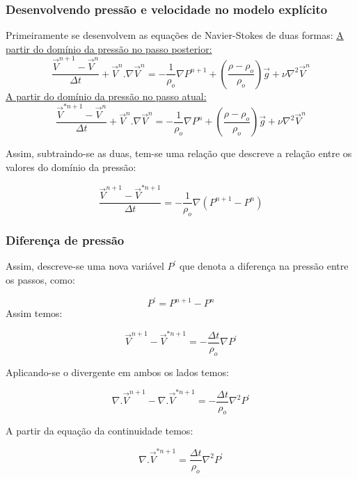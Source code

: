 \documentclass[xcolor=dvipsnames,10pt,aspectratio=169]{beamer}
\begin{document}
	
	\begin{frame}
		\frametitle{Desenvolvendo pressão e velocidade no modelo explícito}
		\flushleft
		Primeiramente se desenvolvem as equações de Navier-Stokes de duas formas:\vspace{0.5cm}
		\centering
		\underline{A partir do domínio da pressão no passo posterior:}
		\begin{equation}\label{equation1}
		\frac{\vec{V}^{n + 1} - \vec{V}^{n}}{\Delta t} + \vec{V}^{n} . {\nabla} \vec{V}^{n} = - \frac{1}{\rho_o}\nabla P^{n + 1} + \left( \frac{\rho - \rho_o}{\rho_o} \right) \vec{g} + \nu \nabla^2 \vec{V}^{n}
		\end{equation}
		\underline{A partir do domínio da pressão no passo atual:}
		\begin{equation}\label{eqlabel1}
		\frac{\vec{V}^{\ast{n + 1}} - \vec{V}^{n}}{\Delta t} + \vec{V}^{n} . {\nabla} \vec{V}^{n} = - \frac{1}{\rho_o}\nabla P^{n} + \left( \frac{\rho - \rho_o}{\rho_o} \right) \vec{g} + \nu \nabla^2 \vec{V}^{n}
		\end{equation}
		
		Assim, subtraindo-se as duas, tem-se uma relação que descreve a relação entre os valores do domínio da pressão:
		
		\begin{equation}
		\frac{\vec{V}^{{n + 1}} - \vec{V}^{{\ast n+1} }}{\Delta t} = - \frac{1}{\rho_o}\nabla \left( P^{n+1} - P ^n\right)
		\end{equation}
		
		
		
	\end{frame}




	\begin{frame}
		\frametitle{Diferença de pressão}
		\flushleft
		Assim, descreve-se uma nova variável $ P^\prime $ que denota a diferença na pressão entre os passos, como:
		
		\begin{equation}
		P^\prime = P^{n + 1} - P^n
		\end{equation}
		Assim temos:
		
		\begin{equation}\label{eqlabel3}
		\vec{V}^{n+1} - \vec{V}^{\ast{n + 1}} = - \frac{\Delta t}{\rho_o} \nabla P^\prime
		\end{equation}
		
		Aplicando-se o divergente em ambos os lados temos:
		
		\begin{equation}
		\nabla . \vec{V}^{n+1} - \nabla .\vec{V}^{\ast{n + 1}} = - \frac{\Delta t}{\rho_o} \nabla^2 P^\prime
		\end{equation}
		
		A partir da equação da continuidade temos:
		
		\begin{equation}\label{eqlabel2}
		\nabla .\vec{V}^{\ast{n + 1}} = \frac{\Delta t}{\rho_o} \nabla^2 P^\prime
		\end{equation}
		
	
	\end{frame}
\end{document}

